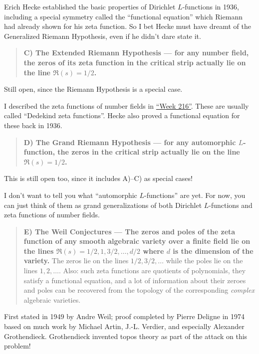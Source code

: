 \documentclass{article}
\begin{document}
Erich Hecke established the basic properties of Dirichlet
\(L\)-functions in 1936, including a special symmetry called the
``functional equation'' which Riemann had already shown for his zeta
function. So I bet Hecke must have dreamt of the Generalized Riemann
Hypothesis, even if he didn't dare state it.

\begin{quote}
\textbf{C) The Extended Riemann Hypothesis --- for any number field, the
zeros of its zeta function in the critical strip actually lie on the
line \(\Re(s) = 1/2\).}
\end{quote}

Still open, since the Riemann Hypothesis is a special case.

I described the zeta functions of number fields in
\protect\hyperlink{week216}{``Week 216''}. These are usually called
``Dedekind zeta functions''. Hecke also proved a functional equation for
these back in 1936.

\begin{quote}
\textbf{D) The Grand Riemann Hypothesis --- for any automorphic
\(L\)-function, the zeros in the critical strip actually lie on the line
\(\Re(s) = 1/2\).}
\end{quote}

This is still open too, since it includes A)--C) as special cases!

I don't want to tell you what ``automorphic \(L\)-functions'' are yet.
For now, you can just think of them as grand generalizations of both
Dirichlet \(L\)-functions and zeta functions of number fields.

\begin{quote}
\textbf{E) The Weil Conjectures --- The zeros and poles of the zeta
function of any smooth algebraic variety over a finite field lie on the
lines \(\Re(s) = 1/2, 1, 3/2, \ldots, d/2\) where \(d\) is the dimension
of the variety.} The zeros lie on the lines \(1/2, 3/2, \ldots\) while
the poles lie on the lines \(1, 2, \ldots\). Also: such zeta functions
are quotients of polynomials, they satisfy a functional equation, and a
lot of information about their zeroes and poles can be recovered from
the topology of the corresponding \emph{complex} algebraic varieties.
\end{quote}

First stated in 1949 by Andre Weil; proof completed by Pierre Deligne in
1974 based on much work by Michael Artin, J.-L. Verdier, and especially
Alexander Grothendieck. Grothendieck invented topos theory as part of
the attack on this problem!
\end{document}
